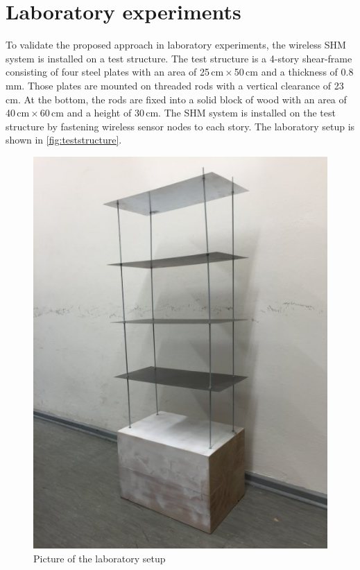 \documentclass[12pt,a4paper]{scrartcl}
\begin{document}


\newpage
\section*{Laboratory experiments}

To validate the proposed approach in laboratory experiments, the wireless SHM system is installed on a test structure.
The test structure is a 4-story shear-frame consisting of four steel plates with an area of 25\,cm\,$\times$\,50\,cm and a thickness of 0.8\,mm.
Those plates are mounted on threaded rods with a vertical clearance of 23\,cm.
At the bottom, the rods are fixed into a solid block of wood with an area of 40\,cm\,$\times$\,60\,cm and a height of 30\,cm.
The SHM system is installed on the test structure by fastening wireless sensor nodes to each story.
The laboratory setup is shown in \autoref{fig:teststructure}.

\begin{figure}[h!]
    \centering
    \includegraphics[scale=0.3]{figures/teststructure.jpg}
    \caption{Picture of the laboratory setup}
    \label{fig:teststructure}
\end{figure}
\end{document}
